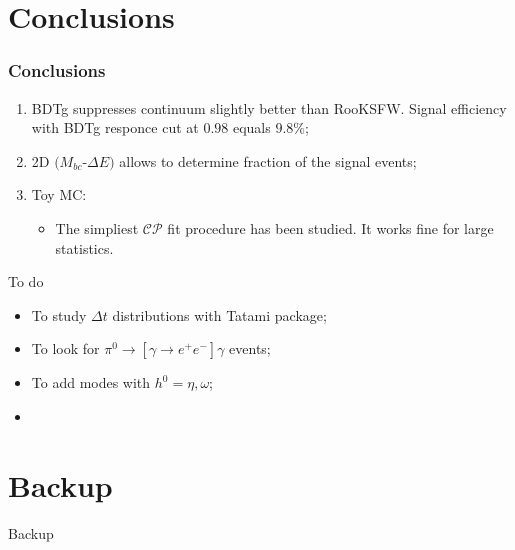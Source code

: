 \documentclass[10 pt,compress,mathserif]{beamer}
\newcommand{\cpconj}{\ensuremath{\mathcal{CP}}\xspace}
\begin{document}
\section{Conclusions}
\begin{frame}
 \frametitle{Conclusions}
 \begin{enumerate}
  \item BDTg suppresses continuum slightly better than RooKSFW. Signal efficiency with BDTg responce cut at $0.98$ equals $9.8\%$;
  \item 2D $(M_{bc}$-$\Delta E)$ allows to determine fraction of the signal events;
  \item Toy MC:
  \begin{itemize}
   \item The simpliest \cpconj fit procedure has been studied. It works fine for large statistics.
  \end{itemize}

 \end{enumerate}
 
 \begin{block}{To do}
  \begin{itemize}
   \item To study $\Delta t$ distributions with Tatami package;
   \item To look for $\pi^0 \to [\gamma \to e^+e^-] \gamma$ events;
   \item To add modes with $h^0=\eta,\omega$;
   \item 
  \end{itemize}
 \end{block}
\end{frame}


\appendix
{}
\setcounter{finalframe}{\value{framenumber}}

\section{Backup}
\begin{frame}
 \begin{center}
  \begin{LARGE}
   Backup
  \end{LARGE}
 \end{center}
\end{frame}
\end{document}
